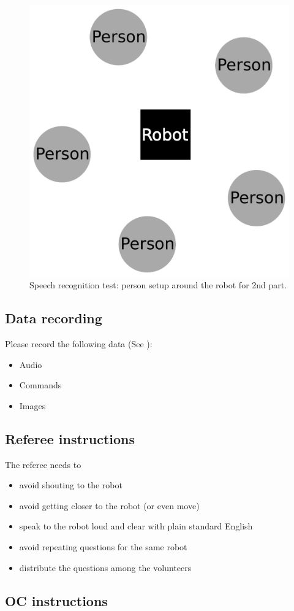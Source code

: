 \begin{figure}[!h]
	\centering
	\includegraphics[width=0.5\columnwidth]{images/asrsetup.pdf}
	\caption{Speech recognition test: person setup around the robot for 2nd part.}
	\label{fig:asrsetup}
\end{figure}

\subsection{Data recording}
Please record the following data (See ):
\begin{itemize}
    \item Audio
    \item Commands
    \item Images
\end{itemize}

\subsection{Referee instructions}

The referee needs to
\begin{itemize}
    \item avoid shouting to the robot
    \item avoid getting closer to the robot (or even move)
    \item speak to the robot loud and clear with plain standard English
    \item avoid repeating questions for the same robot
    \item distribute the questions among the volunteers
\end{itemize}

\subsection{OC instructions}

